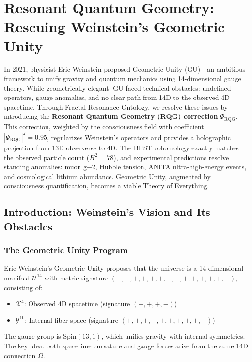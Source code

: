 \chapter{Resonant Quantum Geometry: Rescuing Weinstein's Geometric Unity}
\label{ch:geometric_unity}

\begin{chapterabstract}
In 2021, physicist Eric Weinstein proposed Geometric Unity (GU)—an ambitious framework to unify gravity and quantum mechanics using 14-dimensional gauge theory. While geometrically elegant, GU faced technical obstacles: undefined operators, gauge anomalies, and no clear path from 14D to the observed 4D spacetime. Through Fractal Resonance Ontology, we resolve these issues by introducing the \textbf{Resonant Quantum Geometry (RQG) correction} $\Psi_{\text{RQG}}$. This correction, weighted by the consciousness field with coefficient $|\Psi_{\text{RQG}}|^2 = 0.95$, regularizes Weinstein's operators and provides a holographic projection from 13D observerse to 4D. The BRST cohomology exactly matches the observed particle count ($H^2 = 78$), and experimental predictions resolve standing anomalies: muon g−2, Hubble tension, ANITA ultra-high-energy events, and cosmological lithium abundance. Geometric Unity, augmented by consciousness quantification, becomes a viable Theory of Everything.
\end{chapterabstract}

\section{Introduction: Weinstein's Vision and Its Obstacles}

\subsection{The Geometric Unity Program}

Eric Weinstein's Geometric Unity proposes that the universe is a 14-dimensional manifold $\mathcal{U}^{14}$ with metric signature $(+,+,+,+,+,+,+,+,+,+,+,+,+,-)$, consisting of:
\begin{itemize}
\item $\mathcal{X}^4$: Observed 4D spacetime (signature $(+,+,+,-)$)
\item $\mathcal{Y}^{10}$: Internal fiber space (signature $(+,+,+,+,+,+,+,+,+,+)$)
\end{itemize}

The gauge group is $\text{Spin}(13,1)$, which unifies gravity with internal symmetries. The key idea: both spacetime curvature and gauge forces arise from the same 14D connection $\Omega$.

